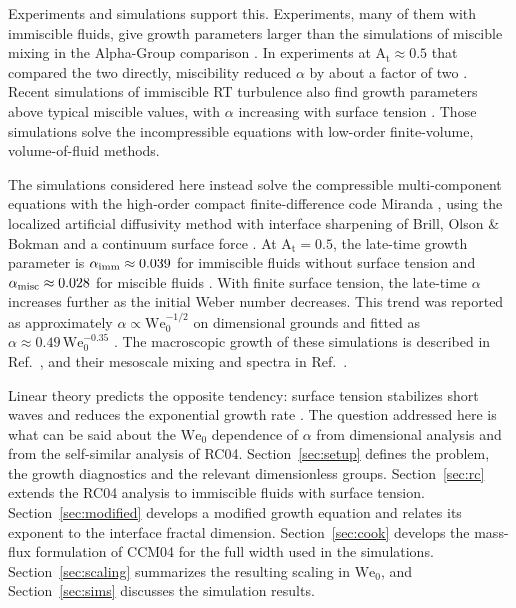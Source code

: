 \documentclass[11pt]{article}
\numberwithin{equation}{section}
\newcommand{\At}{\mathrm{A_t}}
\newcommand{\We}{\mathrm{We}_0}
\begin{document}
Experiments and simulations support this. Experiments, many of them with immiscible fluids, give growth parameters larger than the simulations of miscible mixing in the Alpha-Group comparison \cite{Dimonte2004,Dimonte2000}. In experiments at $\At \approx 0.5$ that compared the two directly, miscibility reduced $\alpha$ by about a factor of two \cite{Roberts2016}. Recent simulations of immiscible RT turbulence \cite{Zhao2026_1,Zhao2026_2} also find growth parameters above typical miscible values, with $\alpha$ increasing with surface tension \cite{Zhao2026_2}. Those simulations solve the incompressible equations with low-order finite-volume, volume-of-fluid methods.

The simulations considered here instead solve the compressible multi-component equations with the high-order compact finite-difference code Miranda \cite{Cook2007}, using the localized artificial diffusivity method with interface sharpening of Brill, Olson \& Bokman \cite{Brill2025} and a continuum surface force \cite{Brackbill1992}. At $\At = 0.5$, the late-time growth parameter is $\alpha_{\rm imm} \approx 0.039$ for immiscible fluids without surface tension and $\alpha_{\rm misc} \approx 0.028$ for miscible fluids \cite{Walker2025,Walker2026,Walker2027_1}. With finite surface tension, the late-time $\alpha$ increases further as the initial Weber number decreases. This trend was reported as approximately $\alpha \propto \We^{-1/2}$ on dimensional grounds and fitted as $\alpha \approx 0.49 \, \We^{-0.35}$ \cite{Walker2026}. The macroscopic growth of these simulations is described in Ref.~\cite{Walker2027_1}, and their mesoscale mixing and spectra in Ref.~\cite{Walker2027_2}.

Linear theory predicts the opposite tendency: surface tension stabilizes short waves and reduces the exponential growth rate \cite{Chandrasekhar_book,Sohn2009}. The question addressed here is what can be said about the $\We$ dependence of $\alpha$ from dimensional analysis and from the self-similar analysis of RC04. Section~\ref{sec:setup} defines the problem, the growth diagnostics and the relevant dimensionless groups. Section~\ref{sec:rc} extends the RC04 analysis to immiscible fluids with surface tension. Section~\ref{sec:modified} develops a modified growth equation and relates its exponent to the interface fractal dimension. Section~\ref{sec:cook} develops the mass-flux formulation of CCM04 for the full width used in the simulations. Section~\ref{sec:scaling} summarizes the resulting scaling in $\We$, and Section~\ref{sec:sims} discusses the simulation results.
\end{document}
